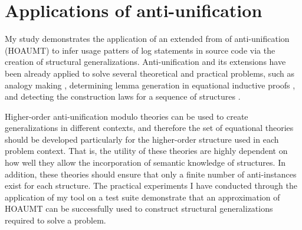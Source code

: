 \section{Applications of anti-unification}  \label{auTheory}
My study demonstrates the application of an extended from of anti-unification (HOAUMT) to infer usage patters of log statements in source code via the creation of structural generalizations. Anti-unification and its extensions have been already applied to solve several theoretical and practical problems, such as analogy making \cite{2010:bsc:schmidt}, determining lemma generation in equational inductive proofs \cite{2005:aij:burghardt}, and detecting the construction laws for a sequence of structures \cite{2005:aij:burghardt}.


Higher-order anti-unification modulo theories can be used to create generalizations in different contexts, and therefore the set of equational theories should be developed particularly for the higher-order structure used in each problem context. That is, the utility of these theories are highly dependent on how well they allow the incorporation of semantic knowledge of structures. In addition, these theories should ensure that only a finite number of anti-instances exist for each structure. The practical experiments I have conducted through the application of my tool on a test suite demonstrate that an approximation of HOAUMT can be successfully used to construct structural generalizations required to solve a problem.



